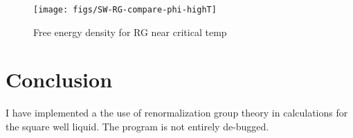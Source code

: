\documentclass[letterpaper,twocolumn,amsmath,amssymb,prb]{revtex4-1}
\newcommand{\1}{\ensuremath{\textbf{r}_1}}
\newcommand{\2}{\ensuremath{\textbf{r}_2}}
\begin{document}
\begin{figure}
  \begin{center}
  \texttt{[image: figs/SW-RG-compare-phi-highT]}
  \end{center}
  \caption{Free energy density for RG near critical temp}
  \label{fig:SW-RG-compare-highT}
\end{figure}



\section{Conclusion}
I have implemented a the use of renormalization group theory in calculations for the square well liquid. The program is not entirely de-bugged.



\end{document}
